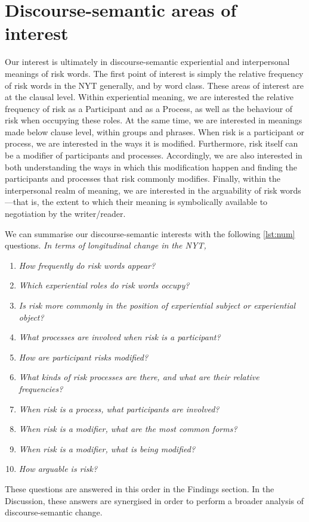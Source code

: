 			\section{Discourse-semantic areas of interest}

				Our interest is ultimately in discourse-semantic experiential and interpersonal meanings of risk words. The first point of interest is simply the relative frequency of risk words in the NYT generally, and by word class. These areas of interest are at the clausal level. Within experiential meaning, we are interested the relative frequency of risk as a Participant and as a Process, as well as the behaviour of risk when occupying these roles. At the same time, we are interested in meanings made below clause level, within groups and phrases. When risk is a participant or process, we are interested in the ways it is modified. Furthermore, risk itself can be a modifier of participants and processes. Accordingly, we are also interested in both understanding the ways in which this modification happen and finding the participants and processes that risk commonly modifies. Finally, within the interpersonal realm of meaning, we are interested in the arguability of risk words---that is, the extent to which their meaning is symbolically available to negotiation by the writer\slash reader.

				We can summarise our discourse-semantic interests with the following \ref{lst:num} questions. \emph{In terms of longitudinal change in the NYT,}

				\begin{enumerate}\setlength\itemsep{-0.5em}
					\item \emph{How frequently do risk words appear?}
					\item \emph{Which experiential roles do risk words occupy?}
					\item \emph{Is risk more commonly in the position of experiential subject or experiential object?}
					\item \emph{What processes are involved when risk is a participant?}
					\item \emph{How are participant risks modified?}
					\item \emph{What kinds of risk processes are there, and what are their relative frequencies?}
					\item \emph{When risk is a process, what participants are involved?}
					\item \emph{When risk is a modifier, what are the most common forms?}
					\item \emph{When risk is a modifier, what is being modified?}
					\item \emph{How arguable is risk?} \label{lst:num}
				\end{enumerate}
				These questions are answered in this order in the Findings section. In the Discussion, these answers are synergised in order to perform a broader analysis of discourse-semantic change.


